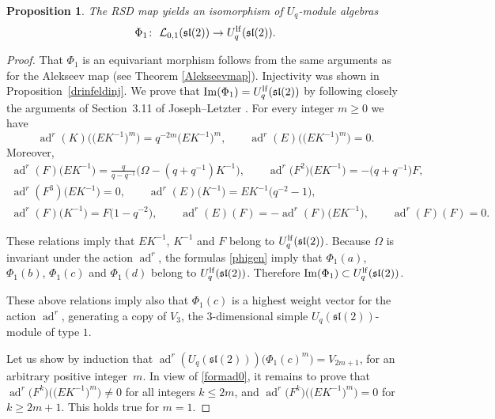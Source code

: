 \documentclass[pdftex]{sigma}%
\numberwithin{equation}{section}
\numberwithin{figure}{section}
\newtheorem{prop}[teo]{Proposition}
\newcommand{\Ll}{{\mathcal L}}
\newcommand{\ra}{\rightarrow}
\begin{document}
\begin{prop}\label{imagephi} The RSD map yields an isomorphism of $U_q$-module algebras
\[\Phi_1\colon \ \Ll_{0,1}({\mathfrak{sl}}(2))\ra U_q^{\rm lf}({\mathfrak{sl}}(2)).\]
\end{prop}
\begin{proof} That $\Phi_1$ is an equivariant morphism follows from the same arguments as for the Alekseev map (see Theorem \ref{Alekseevmap}). Injectivity was shown in Proposition~\ref{drinfeldinj}. We prove that $\operatorname{Im}(\Phi_1) = U_q^{\rm lf}({\mathfrak{sl}}(2))$ by following closely the arguments of Section~3.11 of Joseph--Letzter \cite{JL}. For every integer $m\geq 0$ we have
\begin{equation}\label{formad0}
\operatorname{ad}^r(K)\big(\big(EK^{-1}\big)^m\big) = q^{-2m} \big(EK^{-1}\big)^m ,\qquad \operatorname{ad}^r(E)\big(\big(EK^{-1}\big)^m\big) = 0.
\end{equation}
Moreover,
\begin{gather*}
\operatorname{ad}^r(F)\big(EK^{-1}\big) = \frac{q}{q-q^{-1}}\big(\Omega-(q+q^{-1})K^{-1} \big), \qquad \operatorname{ad}^r\big(F^2\big)\big(EK^{-1}\big) = -\big(q+q^{-1}\big)F, \\
\operatorname{ad}^r(F^3)\big(EK^{-1}\big)=0, \qquad \operatorname{ad}^r(E)\big(K^{-1}\big) = EK^{-1}\big(q^{-2}-1\big), \\
\operatorname{ad}^r(F)\big(K^{-1}\big) = F\big(1-q^{-2}\big), \qquad
\operatorname{ad}^r(E)(F) = - \operatorname{ad}^r(F)\big(EK^{-1}\big), \qquad \operatorname{ad}^r(F)(F) = 0.
\end{gather*}

These relations imply that $EK^{-1}$, $K^{-1}$ and $F$ belong to $U_q^{\rm lf}({\mathfrak{sl}}(2))$. Because $\Omega$ is invariant under the action $\operatorname{ad}^r$,
the formulas \eqref{phigen} imply that $\Phi_1(a)$, $\Phi_1(b)$, $\Phi_1(c)$ and $\Phi_1(d)$ belong to $U_q^{\rm lf}({\mathfrak{sl}}(2))$. Therefore $\operatorname{Im}(\Phi_1) \subset U_q^{\rm lf}({\mathfrak{sl}}(2))$.

These above relations imply also that $\Phi_1(c)$ is a highest weight vector for the action $\operatorname{ad}^r$, generating a copy of $V_3$, the $3$-dimensional simple $U_q({\mathfrak{sl}}(2))$-module of type $1$.

Let us show by induction that $\operatorname{ad}^r(U_q({\mathfrak{sl}}(2)))\big(\Phi_1(c)^m\big) = V_{2m+1}$, for an arbitrary positive integer~$m$. In view of \eqref{formad0}, it remains to prove that $\operatorname{ad}^r\big(F^k\big)\big(\big(EK^{-1}\big)^m\big)\ne 0$ for all integers $k\leq 2m$, and $\operatorname{ad}^r\big(F^k\big)\big(\big(EK^{-1}\big)^m\big)= 0$ for $k\geq 2m+1.$ This holds true for $m=1$.


\end{proof}
\end{document}
